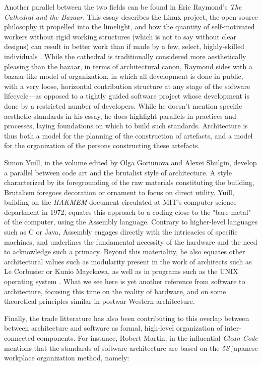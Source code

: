 Another parallel between the two fields can be found in Eric Raymond's \emph{The Cathedral and the Bazaar}. This essay describes the Linux project, the open-source philosophy it propelled into the limelight, and how the quantity of self-motivated workers without rigid working structures (which is not to say without clear designs) can result in better work than if made by a few, select, highly-skilled individuals \citep{raymond_cathedral_2001}. While the cathedral is traditionally considered more aesthetically pleasing than the bazaar, in terms of architectural canon, Raymond sides with a bazaar-like model of organization, in which all development is done in public, with a very loose, horizontal contribution structure at any stage of the software lifecycle—as opposed to a tightly guided software project whose development is done by a restricted number of developers. While he doesn't mention specific aesthetic standards in his essay, he does highlight parallels in practices and processes, laying foundations on which to build such standards. Architecture is thus both a model for the planning of the construction of artefacts, and a model for the organization of the persons constructing these artefacts.

Simon Yuill, in the volume edited by Olga Goriunova and Alexei Shulgin, develop a parallel between code art and the brutalist style of architecture. A style characterized by its foregrounding of the raw materials constituting the building, Brutalism foregoes decoration or ornament to focus on direct utility. Yuill, building on the \emph{HAKMEM} document circulated at MIT's computer science department in 1972, equates this approach to a coding close to the "bare metal" of the computer, using the Assembly language. Contrary to higher-level languages such as C or Java, Assembly engages directly with the intricacies of specific machines, and underlines the fundamental necessity of the hardware and the need to acknowledge such a primacy. Beyond this materiality, he also equates other architectural values such as modularity present in the work of architects such as Le Corbusier or Kunio Mayekawa, as well as in programs such as the UNIX operating system \citep{yuill_code_2004}. What we see here is yet another reference from software to architecture, focusing this time on the reality of hardware, and on some theoretical principles similar in postwar Western architecture.

Finally, the trade litterature has also been contributing to this overlap between between architecture and software as formal, high-level organization of inter-connected components. For instance, Robert Martin, in the influential \emph{Clean Code} mentions that the standards of software architecture are based on the \emph{5S} japanese workplace organization method, namely:

